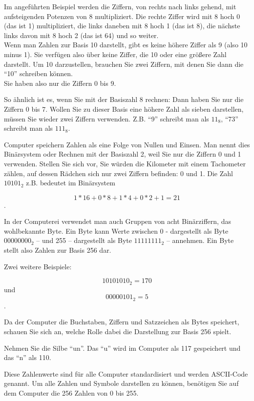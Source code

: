 \documentclass[a4paper,11pt, oneside,openright,titlepage,dvips]{scrbook}
\begin{document}
Im angeführten Beispiel werden die Ziffern, von rechts nach links
gehend, mit aufsteigenden Potenzen von 8 multipliziert. Die rechte
Ziffer wird mit 8 hoch 0 (das ist 1) multipliziert, die links daneben
mit 8 hoch 1 (das ist 8), die nächste links davon mit
8 hoch 2 (das ist 64) und so weiter.\\
Wenn man Zahlen zur Basis 10 darstellt, gibt es keine höhere Ziffer
als 9 (also 10 minus 1). Sie verfügen also über keine Ziffer, die 10
oder eine größere Zahl darstellt. Um 10 darzustellen, brauchen Sie
zwei Ziffern, mit denen Sie dann die "`10"' schreiben können.\\
Sie haben also nur die Ziffern 0 bis 9.

So ähnlich ist es, wenn Sie mit
der Basiszahl 8 rechnen: Dann haben Sie nur die Ziffern 0 bis 7.
Wollen Sie zu dieser Basis eine höhere Zahl als sieben darstellen,
müssen Sie wieder zwei Ziffern verwenden. Z.B. "`9"' schreibt
man als $11_8$, "`73"' schreibt man als $111_8$.


\clearpage

Computer speichern Zahlen als eine Folge von Nullen und Einsen.
Man nennt dies Binärsystem oder Rechnen mit der Basiszahl 2,
weil Sie nur die Ziffern 0 und 1 verwenden. Stellen Sie sich vor,
Sie würden die Kilometer mit einem Tachometer zählen, auf
dessen Rädchen sich nur zwei Ziffern befinden: 0 und 1.
Die Zahl $10101_2$ z.B. bedeutet im Binärsystem

\[ 1 * 16 + 0 * 8 + 1 * 4 + 0 * 2 + 1 = 21 \].

In der Computerei verwendet man auch Gruppen von acht Binärziffern,
das wohlbekannte Byte. Ein Byte kann Werte zwischen 0 - dargestellt
als Byte $00000000_2$ -- und 255 -- dargestellt als Byte
$11111111_2$ -- annehmen. Ein Byte stellt also Zahlen zur Basis 256
dar.

Zwei weitere Beispiele:

\[ 10101010_2 = 170 \] und
\[ 00000101_2 = 5 \].

Da der Computer die Buchstaben, Ziffern und Satzzeichen als Bytes
speichert, schauen Sie sich an, welche Rolle dabei die Darstellung zur
Basis 256 spielt.


\clearpage
Nehmen Sie die Silbe "`un"'. Das "`u"' wird im Computer als 117
gespeichert und das "`n"' als 110.

Diese Zahlenwerte sind für alle Computer standardisiert und werden
ASCII-Code genannt. Um alle Zahlen und Symbole darstellen zu können,
benötigen Sie auf dem Computer die 256 Zahlen von 0 bis 255.
\end{document}
